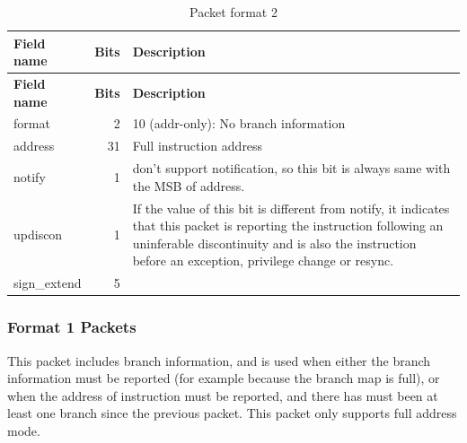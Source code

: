 \documentclass[main\_\_EN.tex]{subfiles}
\begin{document}
\begin{longtable}[c]{ |l|r|L{10cm}| }
    \caption{Packet format 2}
    \label{tab:f2}
    \\\hline{}
    \textbf{Field name} & \textbf{Bits} & \textbf{Description} \\\hline
    \endfirsthead
    \textbf{Field name} & \textbf{Bits} & \textbf{Description} \\\hline
    \endhead
    \endfoot
    \endlastfoot

    format & 2 & 10 (addr-only): No branch information \\\hline
    address & 31 & Full instruction address \\\hline
    notify & 1 & \chipname{} don't support notification, so this bit is always same with the MSB of address. \\\hline
    updiscon & 1 & If the value of this bit is different from notify, it indicates that this packet is reporting the instruction following an uninferable discontinuity and is also the instruction before an exception, privilege change or resync. \\\hline
    sign\_extend & 5
    &  \\\hline
 \end{longtable}


\subsubsection{Format 1 Packets}

This packet includes branch information, and is used when either the branch information must be reported (for example because the branch map is full), or when the address of instruction must be reported, and there has must been at least one branch since the previous packet. This packet only supports full address mode.
\end{document}
